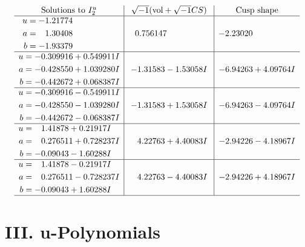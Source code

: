 \documentclass[1p]{elsarticle_modified}
\theoremstyle{definition}
\newcommand{\I}{\sqrt{-1}}
\begin{document}
$$\begin{array}{c|c|c}  
\text{Solutions to }I^u_{2}& \I (\text{vol} + \sqrt{-1}CS) & \text{Cusp shape}\\
 \hline 
\begin{aligned}
u &= -1.21774\phantom{ +0.000000I} \\
a &= \phantom{-}1.30408\phantom{ +0.000000I} \\
b &= -1.93379\phantom{ +0.000000I}\end{aligned}
 & \phantom{-}0.756147\phantom{ +0.000000I} & -2.23020\phantom{ +0.000000I} \\ \hline\begin{aligned}
u &= -0.309916 + 0.549911 I \\
a &= -0.428550 + 1.039280 I \\
b &= -0.442672 + 0.068387 I\end{aligned}
 & -1.31583 - 1.53058 I & -6.94263 + 4.09764 I \\ \hline\begin{aligned}
u &= -0.309916 - 0.549911 I \\
a &= -0.428550 - 1.039280 I \\
b &= -0.442672 - 0.068387 I\end{aligned}
 & -1.31583 + 1.53058 I & -6.94263 - 4.09764 I \\ \hline\begin{aligned}
u &= \phantom{-}1.41878 + 0.21917 I \\
a &= \phantom{-}0.276511 + 0.728237 I \\
b &= -0.09043 - 1.60288 I\end{aligned}
 & \phantom{-}4.22763 + 4.40083 I & -2.94226 - 4.18967 I \\ \hline\begin{aligned}
u &= \phantom{-}1.41878 - 0.21917 I \\
a &= \phantom{-}0.276511 - 0.728237 I \\
b &= -0.09043 + 1.60288 I\end{aligned}
 & \phantom{-}4.22763 - 4.40083 I & -2.94226 + 4.18967 I\\
 \hline 
 \end{array}$$\newpage
\newpage\renewcommand{\arraystretch}{1}
\centering \section*{ III. u-Polynomials}
\end{document}
